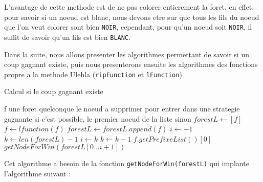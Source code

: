 L'avantage de cette methode est de ne pas colorer entierement la foret, en effet, pour savoir si un noeud est blanc, nous devons etre sur que tous les fils du noeud que l'on veut colorer sont bien \texttt{NOIR}, cependant, pour qu'un noeud soit \texttt{NOIR}, il suffit de savoir qu'un fils est bien \texttt{BLANC}.

Dans la suite, nous allons presenter les algorithmes permettant de savoir si un coup gagnant existe, puis nous presenterons ensuite les algorithmes des fonctions propre a la methode Ulehla (\texttt{ripFunction} et \texttt{lFunction})

\begin{algorithm}[hbt]
  \caption{Calcul si le coup gagnant existe}
  \begin{algorithmic}
    \REQUIRE f une foret quelconque
    \ENSURE le noeud a supprimer pour entrer dans une strategie gagnante si c'est possible, le premier noeud de la liste sinon
    \STATE $forestL \leftarrow [f]$
      \STATE $f \leftarrow lfunction(f)$
      \STATE $forestL \leftarrow forestL.append(f)$
    \ENDWHILE
    \STATE $i \leftarrow -1$
    \STATE $k \leftarrow len(forestL) - 1$
        \STATE $i \leftarrow k$
      \ENDIF
      \STATE $k \leftarrow k - 1$
    \ENDWHILE
      \RETURN $f.getPrefixeList()[0]$
    \ELSE
      \RETURN $getNodeForWin(forestL[0...i + 1])$
    \ENDIF
  \end{algorithmic}
\end{algorithm}

Cet algorithme a besoin de la fonction \texttt{getNodeForWin(forestL)} qui implante l'algorithme suivant :

